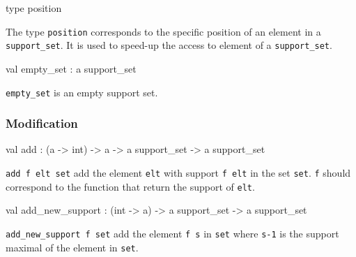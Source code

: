 \label{type:Constraint.position}\begin{ocamldoccode}
type position 
\end{ocamldoccode}
\begin{ocamldocdescription}
The type {\tt{position}} corresponds to the specific position of an element in a {\tt{support\_set}}.
    It is used to speed-up the access to element of a {\tt{support\_set}}.


\end{ocamldocdescription}




\label{val:Constraint.empty-underscoreset}\begin{ocamldoccode}
val empty_set : {\textquotesingle}a support_set
\end{ocamldoccode}
\begin{ocamldocdescription}
{\tt{empty\_set}} is an empty support set.


\end{ocamldocdescription}




\subsubsection{Modification}




\label{val:Constraint.add}\begin{ocamldoccode}
val add : ({\textquotesingle}a -> int) -> {\textquotesingle}a -> {\textquotesingle}a support_set -> {\textquotesingle}a support_set
\end{ocamldoccode}
\begin{ocamldocdescription}
{\tt{add f elt set}} add the element {\tt{elt}} with support {\tt{f elt}} in the set {\tt{set}}. {\tt{f}} should correspond
    to the function that return the support of {\tt{elt}}.


\end{ocamldocdescription}




\label{val:Constraint.add-underscorenew-underscoresupport}\begin{ocamldoccode}
val add_new_support : (int -> {\textquotesingle}a) -> {\textquotesingle}a support_set -> {\textquotesingle}a support_set
\end{ocamldoccode}
\begin{ocamldocdescription}
{\tt{add\_new\_support f set}} add the element {\tt{f s}} in {\tt{set}} where {\tt{s-1}} is the support maximal of the
    element in {\tt{set}}.


\end{ocamldocdescription}




